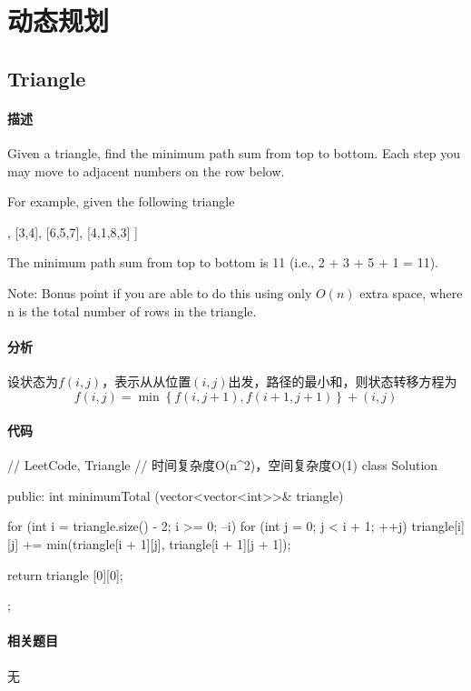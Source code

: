 \chapter{动态规划}


\section{Triangle} %
\label{sec:triangle}


\subsubsection{描述}
Given a triangle, find the minimum path sum from top to bottom. Each step you may move to adjacent numbers on the row below.

For example, given the following triangle
\begin{Code}
[
     [2],
    [3,4],
   [6,5,7],
  [4,1,8,3]
]
\end{Code}
The minimum path sum from top to bottom is 11 (i.e., 2 + 3 + 5 + 1 = 11).

Note: Bonus point if you are able to do this using only $O(n)$ extra space, where n is the total number of rows in the triangle.


\subsubsection{分析}
设状态为$f(i, j)$，表示从从位置$(i,j)$出发，路径的最小和，则状态转移方程为
$$
f(i,j)=\min\left\{f(i,j+1),f(i+1,j+1)\right\}+(i,j)
$$


\subsubsection{代码}
\begin{Code}
// LeetCode, Triangle
// 时间复杂度O(n^2)，空间复杂度O(1)
class Solution {
public:
    int minimumTotal (vector<vector<int>>& triangle) {
        for (int i = triangle.size() - 2; i >= 0; --i)
            for (int j = 0; j < i + 1; ++j)
                triangle[i][j] += min(triangle[i + 1][j],
                        triangle[i + 1][j + 1]);

        return triangle [0][0];
    }
};
\end{Code}


\subsubsection{相关题目}
\begindot
\item 无
\myenddot


